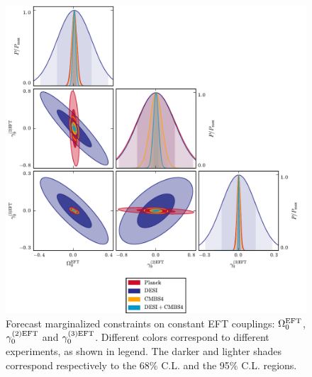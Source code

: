\begin{figure}[!tb]
\begin{center}
\includegraphics[width=1.0\textwidth]{DarkEnergy/6_ConstEFT}
\caption{Forecast marginalized constraints on constant EFT couplings: $\Omega_0^{\rm EFT}$, $\gamma_{0}^{(2){\rm EFT}}$ and $\gamma_{0}^{(3){\rm EFT}}$. Different colors correspond to different experiments, as shown in legend. The darker and lighter shades correspond respectively to the 68\% C.L. and the 95\% C.L. regions.}\label{fig:ConstantEFT}
\end{center}
\end{figure}

